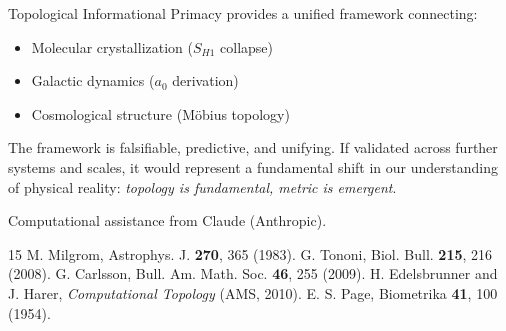 \documentclass[aps,pre,twocolumn,superscriptaddress]{revtex4-2}
\begin{document}
Topological Informational Primacy provides a unified framework connecting:
\begin{itemize}
\item Molecular crystallization ($S_{H1}$ collapse)
\item Galactic dynamics ($a_0$ derivation)
\item Cosmological structure (M\"obius topology)
\end{itemize}

The framework is falsifiable, predictive, and unifying. If validated across further systems and scales, it would represent a fundamental shift in our understanding of physical reality: \textit{topology is fundamental, metric is emergent}.

\begin{acknowledgments}
Computational assistance from Claude (Anthropic).
\end{acknowledgments}

\begin{thebibliography}{15}
 M. Milgrom, Astrophys. J. \textbf{270}, 365 (1983).
 G. Tononi, Biol. Bull. \textbf{215}, 216 (2008).
 G. Carlsson, Bull. Am. Math. Soc. \textbf{46}, 255 (2009).
 H. Edelsbrunner and J. Harer, \textit{Computational Topology} (AMS, 2010).
 E. S. Page, Biometrika \textbf{41}, 100 (1954).
\end{thebibliography}
\end{document}
